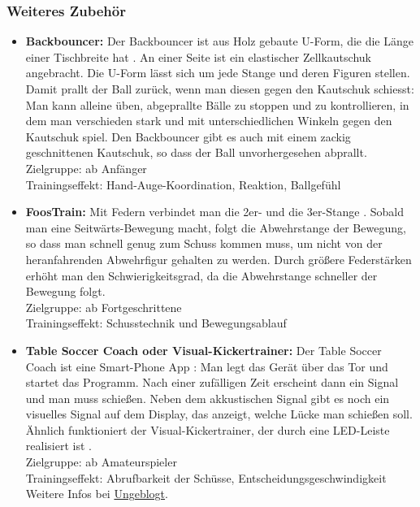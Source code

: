 \subsubsection{Weiteres Zubehör}
\label{tisch:zubehoer:training:weiteres}

\begin{itemize}
    \item {\normalfont \bfseries Backbouncer:}
        Der Backbouncer ist aus Holz gebaute U-Form, die die Länge einer Tischbreite hat \citep{www:kickertrainer}.
        An einer Seite ist ein elastischer Zellkautschuk angebracht.
        Die U-Form lässt sich um jede Stange und deren Figuren stellen. 
        Damit prallt der Ball zurück, wenn man diesen gegen den Kautschuk schiesst: 
        Man kann alleine üben, abgeprallte Bälle zu stoppen und zu kontrollieren, in dem man verschieden stark und mit unterschiedlichen Winkeln gegen den Kautschuk spiel. 
        Den Backbouncer gibt es auch mit einem zackig geschnittenen Kautschuk, so dass der Ball unvorhergesehen abprallt.  
        \\
        Zielgruppe: ab Anfänger 
        \\
        Trainingseffekt: Hand-Auge-Koordination, Reaktion, Ballgefühl
    \item {\normalfont \bfseries FoosTrain:}
        Mit Federn verbindet man die 2er- und die 3er-Stange \citep{www:foostrain}.
        Sobald man eine Seitwärts-Bewegung macht, folgt die Abwehrstange der Bewegung, so dass man schnell genug zum Schuss kommen muss, um nicht von der heranfahrenden Abwehrfigur gehalten zu werden.
        Durch größere Federstärken erhöht man den Schwierigkeitsgrad, da die Abwehrstange schneller der Bewegung folgt.
        \\
        Zielgruppe: ab Fortgeschrittene
        \\
        Trainingseffekt: Schusstechnik und Bewegungsablauf 
    \item {\normalfont \bfseries Table Soccer Coach oder Visual-Kickertrainer:}
        Der Table Soccer Coach ist eine Smart-Phone App \citep{www:tablesoccercoach}:
        Man legt das Gerät über das Tor und startet das Programm. 
        Nach einer zufälligen Zeit erscheint dann ein Signal und man muss schießen.
        Neben dem akkustischen Signal gibt es noch ein visuelles Signal auf dem Display, das anzeigt, welche Lücke man schießen soll.
        Ähnlich funktioniert der Visual-Kickertrainer, der durch eine LED-Leiste realisiert ist \citep{www:visualkickertrainer}.
        \\
        Zielgruppe: ab Amateurspieler 
        \\
        Trainingseffekt: Abrufbarkeit der Schüsse, Entscheidungsgeschwindigkeit
        \\
        Weitere Infos bei \href{http://ungeblogtkickern.blogspot.de/2015/01/table-soccer-coach.html}{Ungeblogt}.


\end{itemize}
